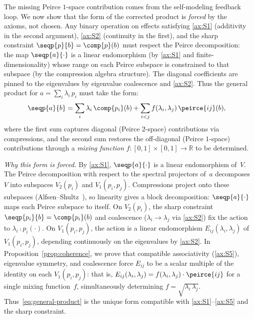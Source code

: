 \documentclass[11pt]{article}
\begin{document}
The missing Peirce $1$-space contribution comes from the self-modeling
feedback loop.  We now show that the form of the corrected product is
\emph{forced} by the axioms, not chosen.  Any binary operation on
effects satisfying \ref{ax:S1} (additivity in the second argument),
\ref{ax:S2} (continuity in the first), and the sharp constraint
$\seqp{p}{b} = \comp{p}(b)$ must respect the Peirce decomposition:
the map $\seqp{a}{\cdot}$ is a linear endomorphism (by \ref{ax:S1}
and finite-dimensionality) whose range on each Peirce subspace is
constrained to that subspace (by the compression algebra structure).
The diagonal coefficients are pinned to the eigenvalues by
eigenvalue coalescence and \ref{ax:S2}.  Thus the general product
for $a = \sum_{i} \lambda_{i}\, p_{i}$ must take the form:
\begin{equation}\label{eq:general-product}
  \seqp{a}{b}
  = \sum_{i} \lambda_{i}\, \comp{p_{i}}(b)
  + \sum_{i < j} f(\lambda_{i}, \lambda_{j})\, \peirce{ij}(b),
\end{equation}
where the first sum captures diagonal (Peirce $2$-space) contributions
via compressions, and the second sum restores the off-diagonal (Peirce
$1$-space) contributions through a \emph{mixing function}
$f: [0,1] \times [0,1] \to \mathbb{R}$ to be determined.

\emph{Why this form is forced.}
By \ref{ax:S1}, $\seqp{a}{\cdot}$ is a linear endomorphism of~$V$.
The Peirce decomposition with respect to the spectral projectors of~$a$
decomposes $V$ into subspaces $V_2(p_i)$ and $V_1(p_i, p_j)$.
Compressions project onto these subspaces
(Alfsen--Shultz~\cite{AlfsenShultz2003}), so linearity gives a block
decomposition: $\seqp{a}{\cdot}$ maps each Peirce subspace to itself.
On $V_2(p_i)$, the sharp constraint $\seqp{p_i}{b} = \comp{p_i}(b)$
and coalescence ($\lambda_i \to \lambda_j$ via \ref{ax:S2}) fix the
action to $\lambda_i \comp{p_i}(\cdot)$.  On $V_1(p_i, p_j)$, the
action is a linear endomorphism $E_{ij}(\lambda_i, \lambda_j)$ of
$V_1(p_i, p_j)$, depending continuously on the eigenvalues by
\ref{ax:S2}.  In Proposition~\ref{prop:coherence}, we prove that
compatible associativity (\ref{ax:S5}), eigenvalue symmetry, and
coalescence force $E_{ij}$ to be a scalar multiple of the identity
on each $V_1(p_i, p_j)$: that is,
$E_{ij}(\lambda_i, \lambda_j) = f(\lambda_i, \lambda_j) \cdot
\peirce{ij}$ for a single mixing function~$f$, simultaneously
determining $f = \sqrt{\lambda_i\, \lambda_j}$.
Thus~\eqref{eq:general-product} is the unique form compatible with
\ref{ax:S1}--\ref{ax:S5} and the sharp constraint.
\end{document}
